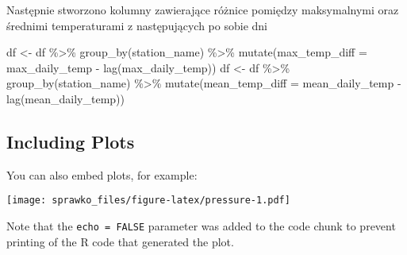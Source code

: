 \documentclass[
]{article}
\newenvironment{Shaded}{\begin{snugshade}}{\end{snugshade}}
\newcommand{\AttributeTok}[1]{\textcolor[rgb]{0.77,0.63,0.00}{#1}}
\newcommand{\FunctionTok}[1]{\textcolor[rgb]{0.00,0.00,0.00}{#1}}
\newcommand{\NormalTok}[1]{#1}
\newcommand{\OtherTok}[1]{\textcolor[rgb]{0.56,0.35,0.01}{#1}}
\newcommand{\SpecialCharTok}[1]{\textcolor[rgb]{0.00,0.00,0.00}{#1}}
\begin{document}
Następnie stworzono kolumny zawierające różnice pomiędzy maksymalnymi
oraz średnimi temperaturami z następujących po sobie dni

\begin{Shaded}
\begin{Highlighting}[]
\NormalTok{df }\OtherTok{\textless{}{-}}\NormalTok{ df }\SpecialCharTok{\%\textgreater{}\%} \FunctionTok{group\_by}\NormalTok{(station\_name) }\SpecialCharTok{\%\textgreater{}\%} \FunctionTok{mutate}\NormalTok{(}\AttributeTok{max\_temp\_diff =}\NormalTok{ max\_daily\_temp }\SpecialCharTok{{-}} \FunctionTok{lag}\NormalTok{(max\_daily\_temp))}
\NormalTok{df }\OtherTok{\textless{}{-}}\NormalTok{ df }\SpecialCharTok{\%\textgreater{}\%} \FunctionTok{group\_by}\NormalTok{(station\_name) }\SpecialCharTok{\%\textgreater{}\%} \FunctionTok{mutate}\NormalTok{(}\AttributeTok{mean\_temp\_diff =}\NormalTok{ mean\_daily\_temp }\SpecialCharTok{{-}} \FunctionTok{lag}\NormalTok{(mean\_daily\_temp))}
\end{Highlighting}
\end{Shaded}

\hypertarget{including-plots}{%
\subsection{Including Plots}\label{including-plots}}

You can also embed plots, for example:

\texttt{[image: sprawko\_files/figure-latex/pressure-1.pdf]}

Note that the \texttt{echo\ =\ FALSE} parameter was added to the code
chunk to prevent printing of the R code that generated the plot.
\end{document}
